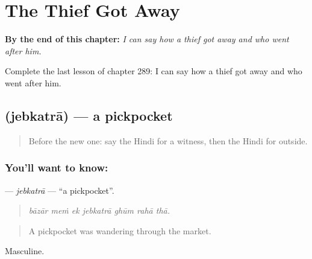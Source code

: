 
\chapter{The Thief Got Away}
\label{ch:hi-the-thief-got-away}

\begin{chapteropening}
\textbf{By the end of this chapter:} \emph{I can say how a thief got away and who went after him.}

Complete the last lesson of chapter 289: I can say how a thief got away and who went after him.
\end{chapteropening}

\section[\texorpdfstring{\hi{जेबकतरा} (jebkatrā)}{जेबकतरा (jebkatrā)}]{ (jebkatrā) — a pickpocket}

\label{lesson:HI-C289-jebkatra}



\begin{quote}
Before the new one: say the Hindi for a witness, then the Hindi for outside.
\end{quote}

\subsection*{You'll want to know: }
\textbf{} — \emph{jebkatrā} — \textquotedblleft{}a pickpocket\textquotedblright{}.

\begin{quote}
      
\end{quote}

\begin{quote}
\emph{bāzār meṁ ek jebkatrā ghūm rahā thā.}
\end{quote}

\begin{quote}
A pickpocket was wandering through the market.
\end{quote}

Masculine.

